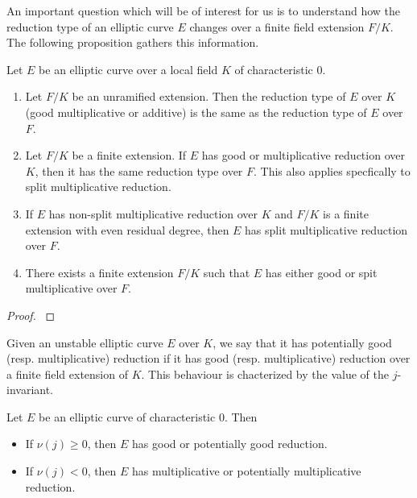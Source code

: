 An important question which will be of interest for us is to understand how the reduction type of an elliptic curve $E$ changes over a finite field extension $F/K$. The following proposition gathers this information.

\begin{prop}\label{prop_semi_red}
    Let $E$ be an elliptic curve over a local field $K$ of characteristic $0$. 
    \begin{enumerate}[label={(\roman*)}]
        \item Let $F/K$ be an unramified extension. Then the reduction type of $E$ over $K$ (good multiplicative or additive) is the same as the reduction type of $E$ over $F$.
        \item Let $F/K$ be a finite extension. If $E$ has good or multiplicative reduction over $K$, then it has the same reduction type over $F$. This also applies specfically to split multiplicative reduction.
        \item If $E$ has non-split multiplicative reduction over $K$ and $F/K$ is a finite extension with even residual degree, then $E$ has split multiplicative reduction over $F$. 
        \item There exists a finite extension $F/K$ such that $E$ has either good or spit multiplicative over $F$.
    \end{enumerate}
\end{prop}
\begin{proof}
    \cite[\S VII Proposition 5.4]{S1} 
\end{proof}

Given an unstable elliptic curve $E$ over $K$, we say that it has potentially good (resp. multiplicative) reduction if it has good (resp. multiplicative) reduction over a finite field extension of $K$. This behaviour is chacterized by the value of the $j$-invariant.

\begin{prop}\label{prop_j_inv}
    Let $E$ be an elliptic curve of characteristic $0$. Then
    \begin{itemize}
        \item If $\nu(j)\geq0$, then $E$ has good or potentially good reduction.
        \item If $\nu(j)<0$, then $E$ has multiplicative or potentially multiplicative reduction.
    \end{itemize}
\end{prop}
